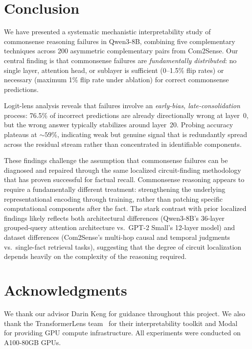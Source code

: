 \documentclass{article}
\begin{document}
\section{Conclusion}
\label{sec:conclusion}

We have presented a systematic mechanistic interpretability study of commonsense reasoning failures in Qwen3-8B, combining five complementary techniques across 200 asymmetric complementary pairs from Com2Sense.
Our central finding is that commonsense failures are \emph{fundamentally distributed}: no single layer, attention head, or sublayer is sufficient (0--1.5\% flip rates) or necessary (maximum 1\% flip rate under ablation) for correct commonsense predictions.

Logit-lens analysis reveals that failures involve an \emph{early-bias, late-consolidation} process: 76.5\% of incorrect predictions are already directionally wrong at layer~0, but the wrong answer typically stabilizes around layer~20.
Probing accuracy plateaus at ${\sim}59$\%, indicating weak but genuine signal that is redundantly spread across the residual stream rather than concentrated in identifiable components.

These findings challenge the assumption that commonsense failures can be diagnosed and repaired through the same localized circuit-finding methodology that has proven successful for factual recall.
Commonsense reasoning appears to require a fundamentally different treatment: strengthening the underlying representational encoding through training, rather than patching specific computational components after the fact.
The stark contrast with prior localized findings likely reflects both architectural differences (Qwen3-8B's 36-layer grouped-query attention architecture vs.\ GPT-2 Small's 12-layer model) and dataset differences (Com2Sense's multi-hop causal and temporal judgments vs.\ single-fact retrieval tasks), suggesting that the degree of circuit localization depends heavily on the complexity of the reasoning required.

\section*{Acknowledgments}
We thank our advisor Darin Keng for guidance throughout this project.
We also thank the TransformerLens team~\citep{nanda2022transformerlens} for their interpretability toolkit and Modal~\citep{modal2023} for providing GPU compute infrastructure.
All experiments were conducted on A100-80GB GPUs.
\end{document}
